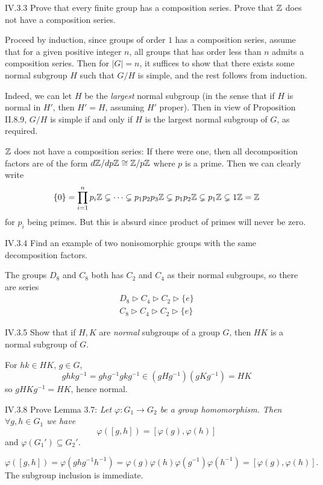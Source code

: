 \begin{problem}{IV.3.3}
Prove that every finite group has a composition series. Prove that $\mathbb{Z}$ does not have a composition series. 
\end{problem}
\begin{pf}
Proceed by induction, since groups of order $1$ has a composition series, assume that for a given positive integer $n$, all groups that has order less than $n$ admits a composition series. Then for $|G|=n$, it suffices to show that there exists some normal subgroup $H$ such that $G/H$ is simple, and the rest follows from induction. 

Indeed, we can let $H$ be the \emph{largest} normal subgroup (in the sense that if $H$ is normal in $H'$, then $H' = H$, assuming $H'$ proper). Then in view of Proposition II.8.9, $G/H$ is simple if and only if $H$ is the largest normal subgroup of $G$, as required.

$\mathbb{Z}$ does not have a composition series: If there were one, then all decomposition factors are of the form $d\mathbb{Z}/dp\mathbb{Z} \cong \mathbb{Z}/p\mathbb{Z}$ where $p$ is a prime. Then we can clearly write 
\[
\{0\} = \prod_{i = 1}^n p_i\mathbb{Z} \subsetneq \cdots \subsetneq p_1p_2p_3\mathbb{Z}  \subsetneq p_1p_2\mathbb{Z} \subsetneq p_1\mathbb{Z} \subsetneq 1\mathbb{Z} = \mathbb{Z}
\]
for $p_i$ being primes. But this is absurd since product of primes will never be zero.
\end{pf}

\begin{problem}{IV.3.4}
Find an example of two nonisomorphic groups with the same decomposition factors.
\end{problem}
\begin{sol}
The groups $D_8$ and $C_8$ both has $C_2$ and $C_4$ as their normal subgroups, so there are series 
\begin{align*}
D_8 \triangleright C_4 \triangleright C_2 \triangleright \{e\} \\
C_8 \triangleright C_4 \triangleright C_2 \triangleright \{e\}
\end{align*}
\end{sol}

\begin{problem}{IV.3.5}
Show that if $H, K$ are \emph{normal} subgroups of a group $G$, then $HK$ is a normal subgroup of $G$. 
\end{problem} 
\begin{pf}
For $hk \in HK$, $g \in G$,
\[
ghkg^{-1} = ghg^{-1}gkg^{-1} \in (gHg^{-1})(gKg^{-1}) = HK
\]
so $gHKg^{-1} = HK$, hence normal.
\end{pf}

\begin{problem}{IV.3.8}
Prove Lemma 3.7: \emph{Let $\varphi:G_1 \to G_2$ be a group homomorphism. Then $\forall g,h \in G_1$ we have}
\[
\varphi([g,h]) = [\varphi(g),\varphi(h)]
\]
and $\varphi(G_1') \subseteq G_2'$.
\end{problem}
\begin{pf}
\[
\varphi([g,h]) = \varphi(ghg^{-1}h^{-1}) = \varphi(g)\varphi(h)\varphi(g^{-1})\varphi(h^{-1}) = [\varphi(g), \varphi(h)].	
\]
The subgroup inclusion is immediate.
\end{pf}